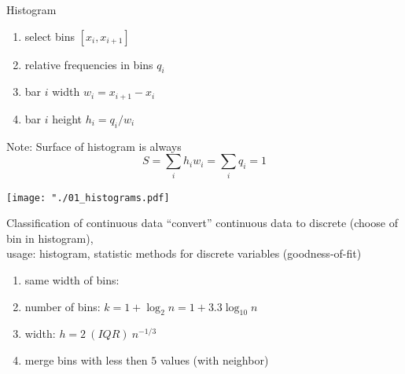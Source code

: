 \documentclass[smaller]{beamer}
\def\xskip{{\vspace{2ex}}}
\begin{document}
\begin{frame}[fragile]{Histogram}
 \begin{enumerate}
  \item select bins $[x_i, x_{i+1}]$
  \item relative frequencies in bins $q_i$
  \item bar $i$ width $w_i = x_{i+1} - x_i$
  \item bar $i$ height $h_i = q_i / w_i$
 \end{enumerate}
 
 \xskip

 Note: Surface of histogram is always
 \[
   S = \sum_i h_i w_i = \sum_i q_i = 1
 \]

\end{frame}

\begin{frame}
\noindent
\hspace{-3ex}\texttt{[image: "./01\_histograms.pdf]}  
\end{frame}


\begin{frame}{Classification of continuous data}
``convert'' continuous data to discrete (choose of bin in histogram),\\
usage: histogram, statistic methods for discrete variables (goodness-of-fit)
\begin{enumerate}
\item same width of bins: 
\item number of bins:  $k = 1+\log_2 n=1+3.3 \log_10 n$
\item width: $h = 2\ (IQR)\ n^{-1/3}$
\item merge bins with less then $5$ values (with neighbor)
\end{enumerate}
\end{frame}
\end{document}
